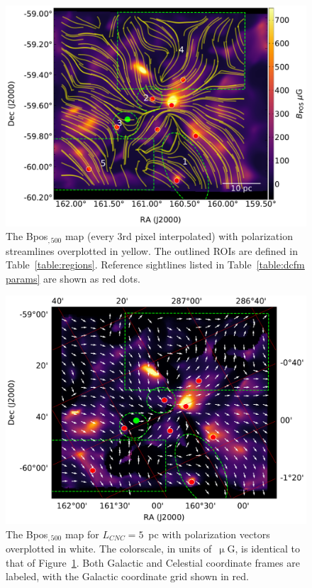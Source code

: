 \begin{figure}[!htbp]
\centering
\includegraphics[width=\textwidth]{figures/carina/cftHI_5arcmin_500_5p0pc}
\caption[~The  map (every 3rd pixel interpolated) with polarization streamlines overplotted in yellow.]{The \gls{Bpos}$_{,500}$ map (every 3rd pixel interpolated) with polarization streamlines overplotted in yellow. The outlined ROIs are defined in Table~\ref{table:regions}. Reference sightlines listed in Table~\ref{table:dcfm params} are shown as red dots.}
\label{fig:DCFM_5_500}
\end{figure}

\begin{figure}[!htbp]
\centering
\includegraphics[width=\textwidth]{figures/carina/B_vectors_500_5p0pc}
\caption[~The  map for ~pc with polarization vectors overplotted in white.]{The \gls{Bpos}$_{,500}$ map for $L_{CNC} = 5$~pc with polarization vectors overplotted in white. The colorscale, in units of~$\upmu$G, is identical to that of Figure~\ref{fig:DCFM_5_500}. Both Galactic and Celestial coordinate frames are labeled, with the Galactic coordinate grid shown in red.}
\label{fig:Bpos_vectors}
\end{figure}

